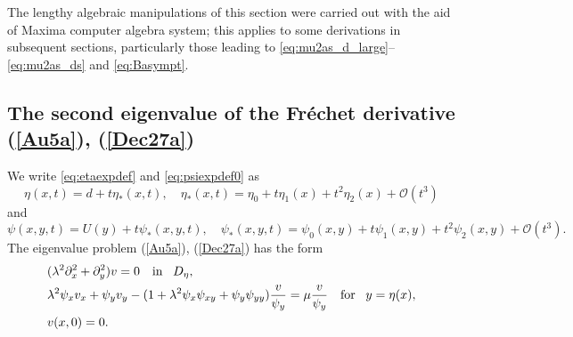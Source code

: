 \documentclass[oneside,a4paper,11pt]{article}
\theoremstyle{thmstyletwo}%
\theoremstyle{thmstylethree}%
\numberwithin{equation}{section}
\def\Obig{\mathcal{O}}
\begin{document}
The lengthy algebraic manipulations of this section were carried out with the aid of Maxima computer algebra system; this applies to some derivations in subsequent sections, particularly those leading to \eqref{eq:mu2as_d_large}--\eqref{eq:mu2as_ds} and \eqref{eq:Basympt}.

\subsection{The second eigenvalue of the Fr\'{e}chet derivative (\ref{Au5a}), (\ref{Dec27a})}
\label{sect:mu2}

We write \eqref{eq:etaexpdef} and \eqref{eq:psiexpdef0} as
$$
\eta(x,t)=d+t\eta_*(x,t),\quad\eta_*(x,t)=\eta_0+t\eta_1(x)+t^2\eta_2(x)+\Obig(t^3)
$$
and
$$
\psi(x,y,t)=U(y)+t\psi_*(x,y,t),\quad\psi_*(x,y,t)=\psi_0(x,y)+t\psi_1(x,y)+t^2\psi_2(x,y)+\Obig(t^3).
$$
The eigenvalue problem (\ref{Au5a}), (\ref{Dec27a}) has the form
\begin{equation}
\label{eq:eigenproblem}
\begin{aligned}
&(\lambda^2\partial_x^2+\partial_y^2)v=0\quad\mbox{in\!}\quad D_\eta,\\
&\lambda^2\psi_xv_x+\psi_yv_y-(1+\lambda^2\psi_x\psi_{xy}+\psi_y\psi_{yy})\frac{v}{\psi_y}=\mu \frac{v}{\psi_y}\quad\mbox{for\!}\quad y=\eta(x),\\
&v(x,0)=0.
\end{aligned}
\end{equation}
\end{document}
